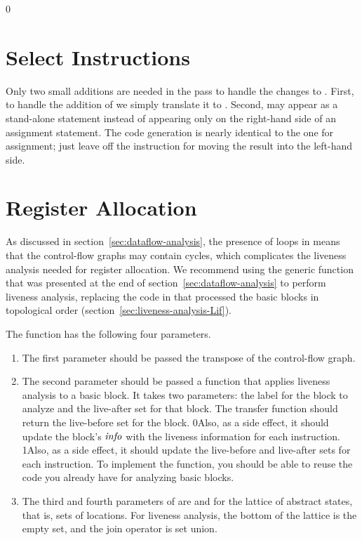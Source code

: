 \documentclass[7x10]{TimesAPriori_MIT}%
\def\racketEd{0}
\def\pythonEd{1}
\def\edition{1}
\newcommand{\racket}[1]{{\if\edition\racketEd{#1}\fi}}
\newcommand{\pythonColor}[0]{}
\newcommand{\python}[1]{{\if\edition\pythonEd\pythonColor #1\fi}}
\numberwithin{theorem}{chapter}
\numberwithin{definition}{chapter}
\numberwithin{equation}{chapter}
\begin{document}
{\if\edition\racketEd
  
\section{Select Instructions}
\label{sec:select-instructions-loop}

Only two small additions are needed in the 
pass to handle the changes to \LangCLoop{}. First, to handle the
addition of \VOID{} we simply translate it to .  Second,
 may appear as a stand-alone statement instead of 
appearing only on the right-hand side of an assignment statement. The code
generation is nearly identical to the one for assignment; just leave
off the instruction for moving the result into the left-hand side.

\fi}

\section{Register Allocation}
\label{sec:register-allocation-loop}

As discussed in section~\ref{sec:dataflow-analysis}, the presence of
loops in \LangLoop{} means that the control-flow graphs may contain cycles,
which complicates the liveness analysis needed for register
allocation.
%
We recommend using the generic  function that
was presented at the end of section~\ref{sec:dataflow-analysis} to
perform liveness analysis, replacing the code in
 that processed the basic blocks in topological
order (section~\ref{sec:liveness-analysis-Lif}).

The  function has the following four parameters.
\begin{enumerate}
\item The first parameter  should be passed the transpose
  of the control-flow graph.
\item The second parameter  should be passed a function
  that applies liveness analysis to a basic block. It takes two
  parameters: the label for the block to analyze and the live-after
  set for that block.  The transfer function should return the
  live-before set for the block.
  \racket{Also, as a side effect, it should update the block's
    $\mathit{info}$ with the liveness information for each instruction.}
  \python{Also, as a side effect, it should update the live-before and
    live-after sets for each instruction.}
  To implement the  function, you should be able to
  reuse the code you already have for analyzing basic blocks.
\item The third and fourth parameters of  are
   and  for the lattice of abstract states,
  that is, sets of locations. For liveness analysis, the bottom of the
  lattice is the empty set, and the join operator is set union.
\end{enumerate}
\end{document}
